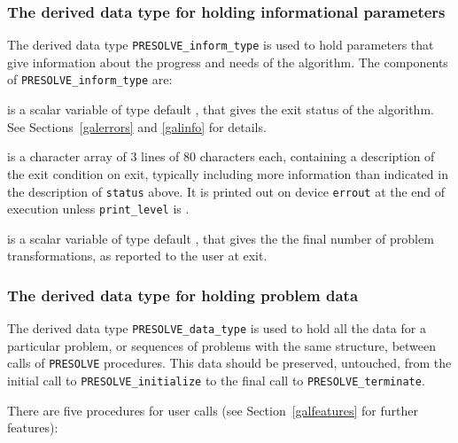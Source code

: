 \documentclass{galahad}
\newcommand{\packagename}{PRESOLVE}
\newcommand{\sym}{\tt\small}
\begin{document}

\subsubsection{The derived data type for holding informational
 parameters}\label{typeinform}
The derived data type
{\tt \packagename\_inform\_type}
is used to hold parameters that give information about the progress and needs
of the algorithm. The components of
{\tt \packagename\_inform\_type}
are:

\begin{description}

 is a scalar variable of type default \integer, that gives the
exit status of the algorithm. See Sections~\ref{galerrors} and \ref{galinfo}
for details.

 is a character array of 3 lines of 80 characters each,
containing a description of the exit condition
on exit, typically including more information
than indicated in the description of {\tt status} above.
It is printed out on device {\tt errout} at the end of execution
unless {\tt print\_level} is {\sym \galsymsilent}.

 is a scalar variable of type default \integer, that
gives the the final number of problem transformations, as reported
to the user at exit.
\end{description}


\subsubsection{The derived data type for holding problem data}\label{typedata}
The derived data type
{\tt \packagename\_data\_type}
is used to hold all the data for a particular problem,
or sequences of problems with the same structure, between calls of
{\tt \packagename} procedures.
This data should be preserved, untouched, from the initial call to
{\tt \packagename\_initialize}
to the final call to
{\tt \packagename\_terminate}.


\galarguments
There are five procedures for user calls
(see Section~\ref{galfeatures} for further features):
\end{document}
